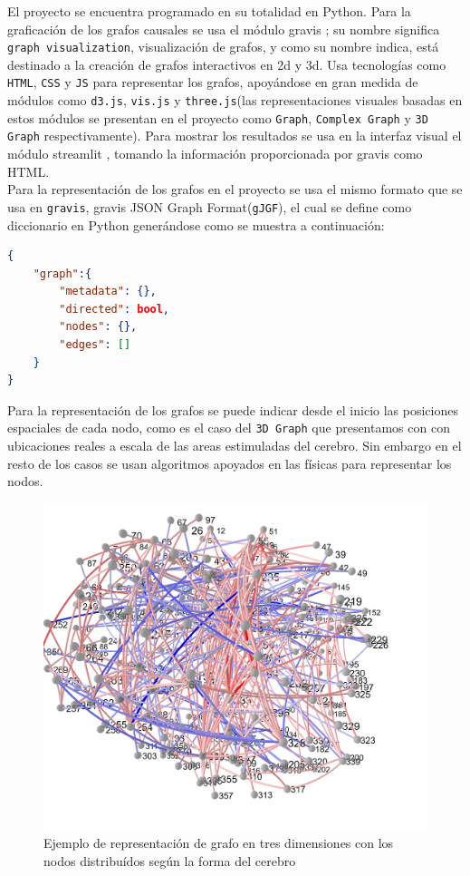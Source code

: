 \documentclass[a4paper,10pt,twocolumn]{article}
\begin{document}
El proyecto se encuentra programado en su totalidad en Python. Para la graficación de los grafos causales
se usa el módulo gravis \cite{gv}; su nombre significa \texttt{graph visualization}, visualización de grafos,
y como su nombre indica, está destinado a la creación de grafos interactivos en 2d y 3d.
Usa tecnologías como \texttt{HTML}, \texttt{CSS} y \texttt{JS} para representar los grafos, apoyándose en gran medida de
módulos como \texttt{d3.js}, \texttt{vis.js} y \texttt{three.js}(las representaciones visuales basadas en estos módulos
se presentan en el proyecto como \texttt{Graph}, \texttt{Complex Graph} y \texttt{3D Graph} respectivamente).
Para mostrar los resultados se usa en la interfaz visual el módulo streamlit \cite{st}, tomando la información proporcionada por gravis como HTML.\\

Para la representación de los grafos en el proyecto se usa el mismo formato que se usa en \texttt{gravis}, gravis JSON Graph Format(\texttt{gJGF}),
el cual se define como diccionario en Python generándose como se muestra a continuación:

\begin{lstlisting}[language=json,firstnumber=1]
{
	"graph":{
		"metadata": {},
		"directed": bool,
		"nodes": {},
		"edges": []
	}	
}
\end{lstlisting}


Para la representación de los grafos se puede indicar desde el inicio las posiciones espaciales de cada nodo,
como es el caso del \texttt{3D Graph} que presentamos con con ubicaciones reales a escala de las areas estimuladas del cerebro.
Sin embargo en el resto de los casos se usan algoritmos apoyados en las físicas para representar los nodos.\\

\begin{figure}[h!]%
\includegraphics[scale=0.1]{3d_graph.jpg}
\caption{Ejemplo de representación de grafo en tres dimensiones con los nodos distribuídos según la forma del cerebro}
\end{figure}
\end{document}
